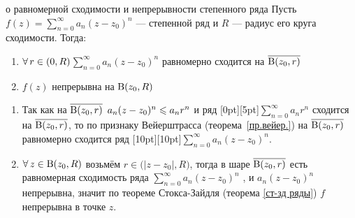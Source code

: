 \begin{teor}[https://youtu.be/zgKkH3Nr6-4?si=Reb0bWLxxqPReBy9&t=3976]{о равномерной сходимости и непрерывности степенного ряда}
		Пусть $f(z) = \sum\limits_{n = 0}^{\infty} a_n(z - z_0)^n$ --- степенной ряд и $R$ --- радиус его круга сходимости. Тогда:
		\begin{enumerate}
			\item $\forall \, r \in (0, R)$\quad $\sum\limits_{n = 0}^{\infty} a_n(z - z_0)^n$ равномерно сходится на $\overline{\mathrm B(z_0, r)}$
			
			\item $f(z)$ непрерывна на $\mathrm B(z_0, R)$
		\end{enumerate}
\end{teor}

\begin{prf}\begin{enumerate}
	\item Так как на $\overline{\mathrm B(z_0, r)}$ $ a_n(z - z_0)^n \leqslant a_n r^n$ и ряд \raisebox{0pt}[0pt][5pt]{$\sum\limits_{n = 0}^{\infty} a_n r^n$} сходится на $\overline{\mathrm B(z_0, r)}$, то по признаку Вейерштрасса (теорема~\ref{пр.вейер.}) на $\overline{\mathrm B(z_0, r)}$ равномерно сходится ряд \raisebox{0pt}[10pt][10pt]{$\sum\limits_{n = 0}^{\infty} a_n(z - z_0)^n$}.
	
	\item $\forall \, z \in \mathrm B(z_0, R)$ возьмём $r \in \bigl(|z - z_0|, R\bigr)$, тогда в шаре $\overline{\mathrm B(z_0, r)}$ есть равномерная сходимость ряда $\sum\limits_{n = 0}^{\infty} a_n(z - z_0)^n$ , и $a_n(z - z_0)^n$ непрерывна, значит по теореме Стокса-Зайдля (теорема \ref{ст-зд ряды}) $f$ непрерывна в точке $z$.
\end{enumerate}\end{prf}